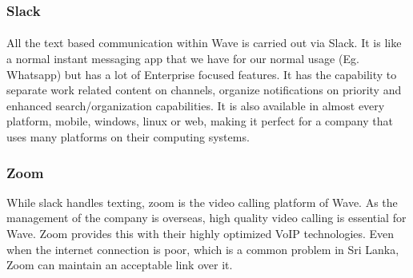 \subsubsection{Slack}
\paragraph{}
All the text based communication within Wave is carried out via Slack. It is like a normal instant messaging app that we have for our normal usage (Eg. Whatsapp) but has a lot of Enterprise focused features. It has the capability to separate work related content on channels, organize notifications on priority and enhanced search/organization capabilities. It is also available in almost every platform, mobile, windows, linux or web, making it perfect for a company that uses many platforms on their computing systems.

\subsubsection{Zoom}
While slack handles texting, zoom is the video calling platform of Wave. As the management of the company is overseas, high quality video calling is essential for Wave. Zoom provides this with their highly optimized VoIP technologies. Even when the internet connection is poor, which is a common problem in Sri Lanka, Zoom can maintain an acceptable link over it. 

\pagebreak